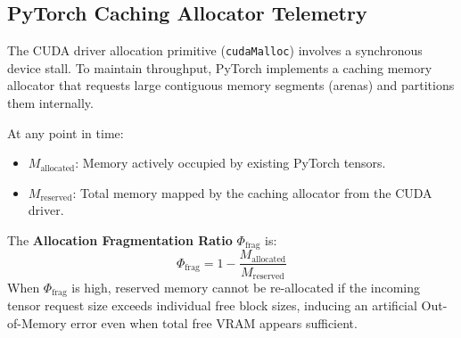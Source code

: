 \documentclass[10pt,twocolumn]{article}
\begin{document}
\subsection{PyTorch Caching Allocator Telemetry}
The CUDA driver allocation primitive (\texttt{cudaMalloc}) involves a synchronous device stall. To maintain throughput, PyTorch implements a caching memory allocator that requests large contiguous memory segments (arenas) and partitions them internally.

At any point in time:
\begin{itemize}
    \item $M_{\text{allocated}}$: Memory actively occupied by existing PyTorch tensors.
    \item $M_{\text{reserved}}$: Total memory mapped by the caching allocator from the CUDA driver.
\end{itemize}
The \textbf{Allocation Fragmentation Ratio} $\Phi_{\text{frag}}$ is:
\begin{equation}
\Phi_{\text{frag}} = 1 - \frac{M_{\text{allocated}}}{M_{\text{reserved}}}
\end{equation}
When $\Phi_{\text{frag}}$ is high, reserved memory cannot be re-allocated if the incoming tensor request size exceeds individual free block sizes, inducing an artificial Out-of-Memory error even when total free VRAM appears sufficient.
\end{document}
